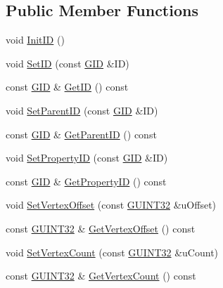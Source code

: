 \subsection*{Public Member Functions}
\begin{DoxyCompactItemize}
\item 
void \hyperlink{class_c_g_object_base_ac5720fc330c44684f3433ccc01b32562}{Init\+I\+D} ()
\item 
void \hyperlink{class_c_g_object_base_a8342b846cf4fd2bbc9f2a9c6232ef494}{Set\+I\+D} (const \hyperlink{_g_types_8h_a5b96ecb16d8e437977d12cd40aa6f6d8}{G\+I\+D} \&I\+D)
\item 
const \hyperlink{_g_types_8h_a5b96ecb16d8e437977d12cd40aa6f6d8}{G\+I\+D} \& \hyperlink{class_c_g_object_base_a7640e450cd6da5cb7e58460e1e529df1}{Get\+I\+D} () const 
\item 
void \hyperlink{class_c_g_object_base_aaee77d769369fa27e98244cea7748969}{Set\+Parent\+I\+D} (const \hyperlink{_g_types_8h_a5b96ecb16d8e437977d12cd40aa6f6d8}{G\+I\+D} \&I\+D)
\item 
const \hyperlink{_g_types_8h_a5b96ecb16d8e437977d12cd40aa6f6d8}{G\+I\+D} \& \hyperlink{class_c_g_object_base_a9de37ede07af126c1b0566ba50d271e2}{Get\+Parent\+I\+D} () const 
\item 
void \hyperlink{class_c_g_object_base_a45912929eb83b50f98b8cdf0d7376117}{Set\+Property\+I\+D} (const \hyperlink{_g_types_8h_a5b96ecb16d8e437977d12cd40aa6f6d8}{G\+I\+D} \&I\+D)
\item 
const \hyperlink{_g_types_8h_a5b96ecb16d8e437977d12cd40aa6f6d8}{G\+I\+D} \& \hyperlink{class_c_g_object_base_a3e2f0c399aa8a939bbeeef814156a64b}{Get\+Property\+I\+D} () const 
\item 
void \hyperlink{class_c_g_object_base_a2d6b5771813f0b413dec65cdb79cc0ad}{Set\+Vertex\+Offset} (const \hyperlink{_g_types_8h_a2e1a1c77d1349057202e2f34e071019c}{G\+U\+I\+N\+T32} \&u\+Offset)
\item 
const \hyperlink{_g_types_8h_a2e1a1c77d1349057202e2f34e071019c}{G\+U\+I\+N\+T32} \& \hyperlink{class_c_g_object_base_a4d04d21e01996648c2cca12c31ad6f9b}{Get\+Vertex\+Offset} () const 
\item 
void \hyperlink{class_c_g_object_base_a4269c05499f9fecf4a39fd20f5e92aac}{Set\+Vertex\+Count} (const \hyperlink{_g_types_8h_a2e1a1c77d1349057202e2f34e071019c}{G\+U\+I\+N\+T32} \&u\+Count)
\item 
const \hyperlink{_g_types_8h_a2e1a1c77d1349057202e2f34e071019c}{G\+U\+I\+N\+T32} \& \hyperlink{class_c_g_object_base_a8f3d1746ce3c3a1be699a05f4f3de29d}{Get\+Vertex\+Count} () const 

\end{DoxyCompactItemize}
